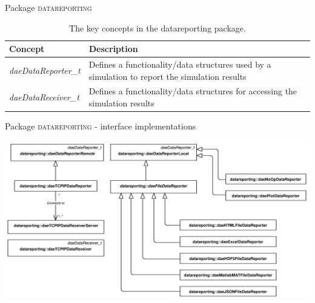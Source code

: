\documentclass[compress,newPxFont,sthlmFooter]{beamer}
\begin{document}
\begin{frame}{Package \textsc{datareporting}}
\scriptsize
{
\begin{table}
  \caption*{The key concepts in the \alert{datareporting} package.}
  \begin{tabularx}{\linewidth}{l>{\raggedright}X}
    \toprule
    \textcolor{sthlmRed}{\textbf{Concept}} & \textcolor{sthlmRed}{\textbf{Description}} \tabularnewline
    \midrule
    \textcolor{sthlmRed}{\textit{daeDataReporter\_t}} & Defines a functionality/data structures used by a simulation to report the simulation results \tabularnewline 
    \textcolor{sthlmRed}{\textit{daeDataReceiver\_t}} & Defines a functionality/data structures for accessing the simulation results \tabularnewline
    \bottomrule
  \end{tabularx}
\end{table}
}
\end{frame}

\begin{frame}{Package \textsc{datareporting} - interface implementations}
    \begin{center}
        \includegraphics[width=0.8\paperwidth]{Supplemental_Figure_S6.png}      
    \end{center}
\end{frame}
\end{document}
